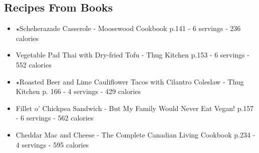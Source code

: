 \subsection*{Recipes From Books}
\begin{itemize}
    \item $\star$Scheherazade Casserole - Moosewood Cookbook p.141 - 6 servings - 236 calories
    \item Vegetable Pad Thai with Dry-fried Tofu - Thug Kitchen p.153 - 6 servings - 552 calories
    \item $\star$Roasted Beer and Lime Cauliflower Tacos with Cilantro Coleslaw - Thug Kitchen p. 166 - 4 servings - 429 calories
    \item Fillet o' Chickpea Sandwich - But My Family Would Never Eat Vegan! p.157 - 6 servings - 562 calories
    \item Cheddar Mac and Cheese - The Complete Canadian Living Cookbook p.234 - 4 servings - 595 calories
\end{itemize}